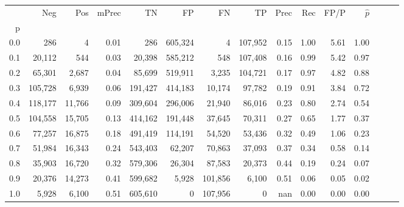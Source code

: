 \begin{tabular}{rrrrrrrrrrrrrrr}
\toprule
{} &      Neg &     Pos & mPrec &       TN &       FP &       FN &       TP &  Prec &   Rec &  FP/P & $\hat{p}$ \\
p   &          &         &       &          &          &          &          &       &       &       &           \\
\midrule
0.0 &      286 &       4 &  0.01 &      286 &  605,324 &        4 &  107,952 &  0.15 &  1.00 &  5.61 &      1.00 \\
0.1 &   20,112 &     544 &  0.03 &   20,398 &  585,212 &      548 &  107,408 &  0.16 &  0.99 &  5.42 &      0.97 \\
0.2 &   65,301 &   2,687 &  0.04 &   85,699 &  519,911 &    3,235 &  104,721 &  0.17 &  0.97 &  4.82 &      0.88 \\
0.3 &  105,728 &   6,939 &  0.06 &  191,427 &  414,183 &   10,174 &   97,782 &  0.19 &  0.91 &  3.84 &      0.72 \\
0.4 &  118,177 &  11,766 &  0.09 &  309,604 &  296,006 &   21,940 &   86,016 &  0.23 &  0.80 &  2.74 &      0.54 \\
0.5 &  104,558 &  15,705 &  0.13 &  414,162 &  191,448 &   37,645 &   70,311 &  0.27 &  0.65 &  1.77 &      0.37 \\
0.6 &   77,257 &  16,875 &  0.18 &  491,419 &  114,191 &   54,520 &   53,436 &  0.32 &  0.49 &  1.06 &      0.23 \\
0.7 &   51,984 &  16,343 &  0.24 &  543,403 &   62,207 &   70,863 &   37,093 &  0.37 &  0.34 &  0.58 &      0.14 \\
0.8 &   35,903 &  16,720 &  0.32 &  579,306 &   26,304 &   87,583 &   20,373 &  0.44 &  0.19 &  0.24 &      0.07 \\
0.9 &   20,376 &  14,273 &  0.41 &  599,682 &    5,928 &  101,856 &    6,100 &  0.51 &  0.06 &  0.05 &      0.02 \\
1.0 &    5,928 &   6,100 &  0.51 &  605,610 &        0 &  107,956 &        0 &   nan &  0.00 &  0.00 &      0.00 \\
\bottomrule
\end{tabular}
